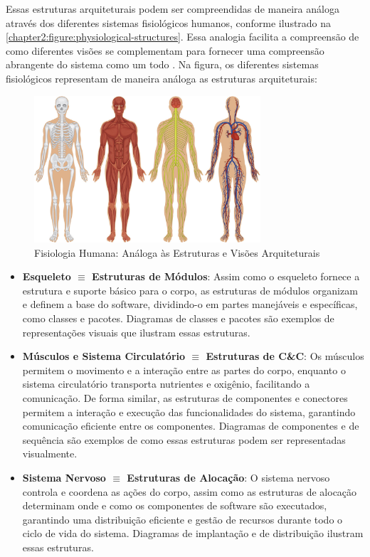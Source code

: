 Essas estruturas arquiteturais podem ser compreendidas de maneira análoga através dos diferentes sistemas fisiológicos humanos, conforme ilustrado na \autoref{chapter2:figure:physiological-structures}. Essa analogia facilita a compreensão de como diferentes visões se complementam para fornecer uma compreensão abrangente do sistema como um todo \cite{Bass2021}. Na figura, os diferentes sistemas fisiológicos representam de maneira análoga as estruturas arquiteturais:

\begin{figure}[htb]
\centering
\caption{Fisiologia Humana: Análoga às Estruturas e Visões Arquiteturais}
\label{chapter2:figure:physiological-structures}
\includegraphics[width=0.75\textwidth]{images/chapter2-arch-physiological-structures.jpeg}
\end{figure}

\begin{itemize}
    \item \textbf{Esqueleto $\equiv$ Estruturas de Módulos}: Assim como o esqueleto fornece a estrutura e suporte básico para o corpo, as estruturas de módulos organizam e definem a base do software, dividindo-o em partes manejáveis e específicas, como classes e pacotes. Diagramas de classes e pacotes são exemplos de representações visuais que ilustram essas estruturas.

    \item \textbf{Músculos e Sistema Circulatório $\equiv$ Estruturas de C\&C}: Os músculos permitem o movimento e a interação entre as partes do corpo, enquanto o sistema circulatório transporta nutrientes e oxigênio, facilitando a comunicação. De forma similar, as estruturas de componentes e conectores permitem a interação e execução das funcionalidades do sistema, garantindo comunicação eficiente entre os componentes. Diagramas de componentes e de sequência são exemplos de como essas estruturas podem ser representadas visualmente.

    \item \textbf{Sistema Nervoso $\equiv$ Estruturas de Alocação}: O sistema nervoso controla e coordena as ações do corpo, assim como as estruturas de alocação determinam onde e como os componentes de software são executados, garantindo uma distribuição eficiente e gestão de recursos durante todo o ciclo de vida do sistema. Diagramas de implantação e de distribuição ilustram essas estruturas.
\end{itemize}

